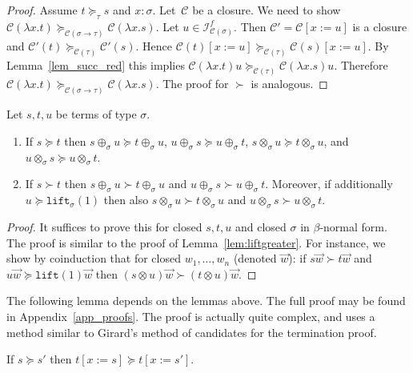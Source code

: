 \documentclass[a4paper,UKenglish,cleveref,autoref,numberwithinsect]{lipics-v2019}
\theoremstyle{definition}
\newcommand{\Iterms}{\mathcal{I}}
\newcommand{\arrtype}{\rightarrow}
\newcommand{\subst}[2]{#1:=#2}
\newcommand{\abs}[2]{\lambda #1.#2}
\newcommand{\lift}{\mathtt{lift}}
\newcommand{\cl}{\mathcal{C}}
\begin{document}
\begin{proof}
  Assume $t \succeq_\tau s$ and $x : \sigma$. Let~$\cl$
  be a closure. We need to show
  $\cl(\abs{x}{t}) \succeq_{\cl(\sigma\arrtype\tau)}
  \cl(\abs{x}{s})$. Let $u \in \Iterms^f_{\cl(\sigma)}$. Then
  $\cl' = \cl[\subst{x}{u}]$ is a closure and
  $\cl'(t) \succeq_{\cl(\tau)} \cl'(s)$. Hence
  $\cl(t)[\subst{x}{u}] \succeq_{\cl(\tau)} \cl(s)[\subst{x}{u}]$. By
  Lemma~\ref{lem_succ_red} this implies
  $\cl(\abs{x}{t}) u \succeq_{\cl(\tau)} \cl(\abs{x}{s}) u$. Therefore
  $\cl(\abs{x}{t}) \succeq_{\cl(\sigma\arrtype\tau)}
  \cl(\abs{x}{s})$. The proof for $\succ$ is analogous.
\end{proof}

\begin{lemma}\label{lem:plustimesmonotonic}
  Let $s,t,u$ be terms of type $\sigma$.
  \begin{enumerate}
  \item If $s \succeq t$ then $s \oplus_\sigma u \succeq t
    \oplus_\sigma u$, $u \oplus_\sigma s \succeq u \oplus_\sigma t$,
    $s \otimes_\sigma u \succeq t \otimes_\sigma u$, and $u
    \otimes_\sigma s \succeq u \otimes_\sigma t$.
  \item If $s \succ t$ then $s \oplus_\sigma u \succ t \oplus_\sigma
    u$ and $u \oplus_\sigma s \succ u \oplus_\sigma t$. Moreover, if
    additionally $u \succeq \lift_\sigma(1)$ then also $s
    \otimes_\sigma u \succ t \otimes_\sigma u$ and $u \otimes_\sigma s
    \succ u \otimes_\sigma t$.
  \end{enumerate}
\end{lemma}

\begin{proof}
  It suffices to prove this for closed $s,t,u$ and closed $\sigma$ in
  $\beta$-normal form. The proof is similar to the proof of
  Lemma~\ref{lem:liftgreater}. For instance, we show by coinduction
  that for closed $w_1,\ldots,w_n$ (denoted $\vec{w}$): if
  $s \vec{w} \succ t \vec{w}$ and $u \vec{w} \succeq \lift(1) \vec{w}$
  then $(s \otimes u) \vec{w} \succ (t \otimes u) \vec{w}$.
\end{proof}

The following lemma depends on the lemmas above. The full proof may be
found in Appendix~\ref{app_proofs}. The proof is actually quite
complex, and uses a method similar to Girard's method of candidates
for the termination proof.

\begin{lemma}\label{lem_succeq_subst}
  If $s \succeq s'$ then $t[\subst{x}{s}] \succeq t[\subst{x}{s'}]$.
\end{lemma}
\end{document}
